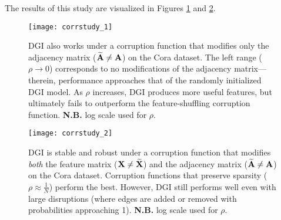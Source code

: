 \documentclass{article} \usepackage{iclr2019_conference,times}
\begin{document}
The results of this study are visualized in Figures \ref{fig:adj_only_corruption} and \ref{fig:adj_corruption}.

\begin{figure}
    \centering
    \texttt{[image: corrstudy\_1]}
    \caption{DGI also works under a corruption function that modifies only the adjacency matrix (${\bf \widetilde{A}} \neq {\bf A}$) on the Cora dataset.  The left range ($\rho \rightarrow 0$) corresponds to no modifications of the adjacency matrix---therein, performance approaches that of the randomly initialized DGI model. As $\rho$ increases, DGI produces more useful features, but ultimately fails to outperform the feature-shuffling corruption function. {\bf N.B.} log scale used for $\rho$.}
    \label{fig:adj_only_corruption}
\end{figure}

\begin{figure}
    \centering
    \texttt{[image: corrstudy\_2]}
    \caption{DGI is stable and robust under a corruption function that modifies \textit{both} the feature matrix ($\bf X \neq \bf \widetilde{X}$) and the adjacency matrix (${\bf \widetilde{A}} \neq {\bf A}$) on the Cora dataset. Corruption functions that preserve sparsity ($\rho\approx \frac{1}{N}$) perform the best. However, DGI still performs well even with large disruptions (where edges are added or removed with probabilities approaching 1). {\bf N.B.} log scale used for $\rho$.}
    \label{fig:adj_corruption}
\end{figure}

 
\end{document}
